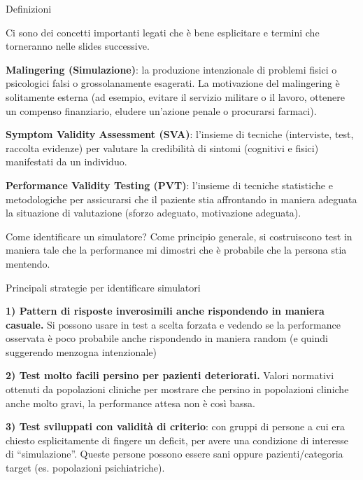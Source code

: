 \documentclass[
  ignorenonframetext,
  aspectratio=169,
]{beamer}
\begin{document}
\begin{frame}{Definizioni}
\label{definizioni}
\small

Ci sono dei concetti importanti legati che è bene esplicitare e termini
che torneranno nelle slides successive.

\textbf{Malingering (Simulazione)}: la produzione intenzionale di
problemi fisici o psicologici falsi o grossolanamente esagerati. La
motivazione del malingering è solitamente esterna (ad esempio, evitare
il servizio militare o il lavoro, ottenere un compenso finanziario,
eludere un'azione penale o procurarsi farmaci).

\textbf{Symptom Validity Assessment (SVA)}: l'insieme di tecniche
(interviste, test, raccolta evidenze) per valutare la credibilità di
sintomi (cognitivi e fisici) manifestati da un individuo.

\textbf{Performance Validity Testing (PVT)}: l'insieme di tecniche
statistiche e metodologiche per assicurarsi che il paziente stia
affrontando in maniera adeguata la situazione di valutazione (sforzo
adeguato, motivazione adeguata).
\end{frame}

\begin{frame}{Come identificare un simulatore?}
\label{come-identificare-un-simulatore}
Come principio generale, si costruiscono test in maniera tale che la
performance mi dimostri che è probabile che la persona stia mentendo.
\end{frame}

\begin{frame}{Principali strategie per identificare simulatori}
\label{principali-strategie-per-identificare-simulatori}
\small

\textbf{1) Pattern di risposte inverosimili anche rispondendo in maniera
casuale.} Si possono usare in test a scelta forzata e vedendo se la
performance osservata è poco probabile anche rispondendo in maniera
random (e quindi suggerendo menzogna intenzionale)

\textbf{2) Test molto facili persino per pazienti deteriorati.} Valori
normativi ottenuti da popolazioni cliniche per mostrare che persino in
popolazioni cliniche anche molto gravi, la performance attesa non è così
bassa.

\textbf{3) Test sviluppati con validità di criterio}: con gruppi di
persone a cui era chiesto esplicitamente di fingere un deficit, per
avere una condizione di interesse di ``simulazione''. Queste persone
possono essere sani oppure pazienti/categoria target (es. popolazioni
psichiatriche).
\end{frame}
\end{document}
